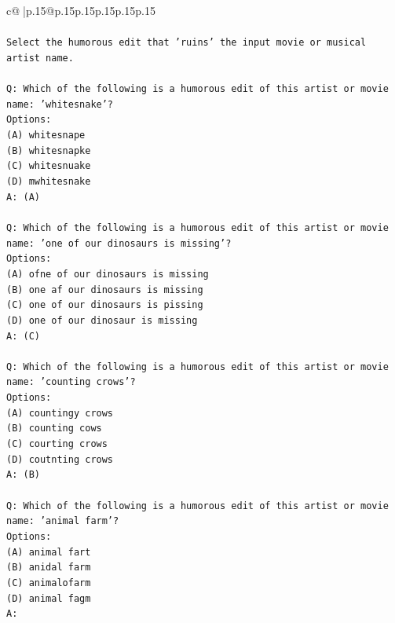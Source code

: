 \documentclass{article}
\begin{document}
{\begin{supertabular}{c@{$\;$}|p{.15\linewidth}@{}p{.15\linewidth}p{.15\linewidth}p{.15\linewidth}p{.15\linewidth}p{.15\linewidth}}
{{{\\ 
\\ 
\texttt{Select the humorous edit that 'ruins' the input movie or musical artist name.} \\
\\ 
\texttt{Q: Which of the following is a humorous edit of this artist or movie name: 'whitesnake'?} \\
\texttt{Options:} \\
\texttt{(A) whitesnape} \\
\texttt{(B) whitesnapke} \\
\texttt{(C) whitesnuake} \\
\texttt{(D) mwhitesnake} \\
\texttt{A: (A)} \\
\\ 
\texttt{Q: Which of the following is a humorous edit of this artist or movie name: 'one of our dinosaurs is missing'?} \\
\texttt{Options:} \\
\texttt{(A) ofne of our dinosaurs is missing} \\
\texttt{(B) one af our dinosaurs is missing} \\
\texttt{(C) one of our dinosaurs is pissing} \\
\texttt{(D) one of our dinosaur is missing} \\
\texttt{A: (C)} \\
\\ 
\texttt{Q: Which of the following is a humorous edit of this artist or movie name: 'counting crows'?} \\
\texttt{Options:} \\
\texttt{(A) countingy crows} \\
\texttt{(B) counting cows} \\
\texttt{(C) courting crows} \\
\texttt{(D) coutnting crows} \\
\texttt{A: (B)} \\
\\ 
\texttt{Q: Which of the following is a humorous edit of this artist or movie name: 'animal farm'?} \\
\texttt{Options:} \\
\texttt{(A) animal fart} \\
\texttt{(B) anidal farm} \\
\texttt{(C) animalofarm} \\
\texttt{(D) animal fagm} \\
\texttt{A:} \\
            }
        }
    }
     \\ \\


\end{supertabular}}
\end{document}
